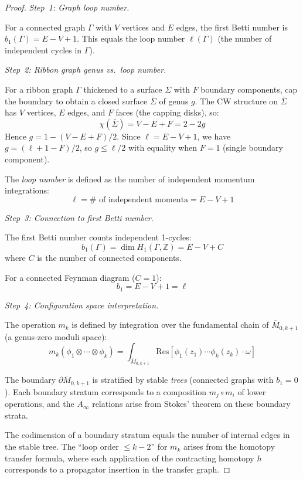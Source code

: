 \begin{proof}
\emph{Step~1: Graph loop number.}

For a connected graph $\Gamma$ with $V$ vertices and $E$ edges,
the first Betti number is $b_1(\Gamma) = E - V + 1$.  This equals the
loop number $\ell(\Gamma)$ (the number of independent cycles in $\Gamma$).

\emph{Step~2: Ribbon graph genus vs.\ loop number.}

For a ribbon graph $\Gamma$ thickened to a surface $\Sigma$ with $F$ boundary components, cap the boundary to obtain a closed surface $\bar{\Sigma}$ of genus $g$.  The CW structure on $\bar{\Sigma}$ has $V$ vertices, $E$ edges, and $F$ faces (the capping disks), so:
\[\chi(\bar{\Sigma}) = V - E + F = 2 - 2g\]
Hence $g = 1 - (V - E + F)/2$.  Since $\ell = E - V + 1$, we have $g = (\ell + 1 - F)/2$,
so $g \leq \ell/2$ with equality when $F = 1$ (single boundary component).

The \emph{loop number} is defined as the number of independent momentum integrations:
\[\ell = \# \text{ of independent momenta} = E - V + 1\]

\emph{Step~3: Connection to first Betti number.}

The first Betti number counts independent 1-cycles:
\[b_1(\Gamma) = \dim H_1(\Gamma, \mathbb{Z}) = E - V + C\]
where $C$ is the number of connected components.

For a connected Feynman diagram ($C=1$):
\[b_1 = E - V + 1 = \ell\]

\emph{Step~4: Configuration space interpretation.}

The operation $m_k$ is defined by integration over the fundamental chain of
$\overline{M}_{0,k+1}$ (a genus-zero moduli space):
\[m_k(\phi_1 \otimes \cdots \otimes \phi_k) = \int_{\overline{M}_{0,k+1}}
\text{Res}[\phi_1(z_1) \cdots \phi_k(z_k) \cdot \omega]\]

The boundary $\partial\overline{M}_{0,k+1}$ is stratified by stable \emph{trees}
(connected graphs with $b_1 = 0$).  Each boundary stratum corresponds to a
composition $m_j \circ m_i$ of lower operations, and the $A_\infty$ relations arise
from Stokes' theorem on these boundary strata.

The codimension of a boundary stratum equals the number of internal edges in
the stable tree.  The ``loop order $\leq k-2$'' for $m_k$ arises from the
homotopy transfer formula, where each application of the contracting
homotopy $h$ corresponds to a propagator insertion in the transfer graph.
\end{proof}

